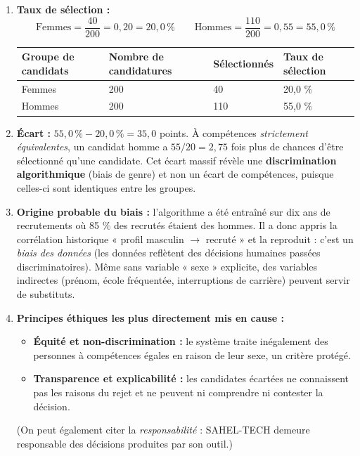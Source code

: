\documentclass[11pt]{article}
\begin{document}
\begin{corrige}
\begin{enumerate}
\item \textbf{Taux de sélection :}
\[ \text{Femmes} = \frac{40}{200} = 0,20 = 20,0\,\% \qquad \text{Hommes} = \frac{110}{200} = 0,55 = 55,0\,\% \]
\begin{center}
\begin{tabularx}{\linewidth}{|l|X|X|X|}
\hline
\rowcolor{popblueL} \textbf{Groupe de candidats} & \textbf{Nombre de candidatures} & \textbf{Sélectionnés} & \textbf{Taux de sélection} \\
\hline
Femmes & 200 & 40 & 20,0 \% \\
\hline
Hommes & 200 & 110 & 55,0 \% \\
\hline
\end{tabularx}
\end{center}
\item \textbf{Écart :} $55,0\,\% - 20,0\,\% = 35,0$ points. À compétences \emph{strictement équivalentes}, un candidat homme a $55/20 = 2,75$ fois plus de chances d'être sélectionné qu'une candidate. Cet écart massif révèle une \textbf{discrimination algorithmique} (biais de genre) et non un écart de compétences, puisque celles-ci sont identiques entre les groupes.
\item \textbf{Origine probable du biais :} l'algorithme a été entraîné sur dix ans de recrutements où 85 \% des recrutés étaient des hommes. Il a donc appris la corrélation historique « profil masculin $\to$ recruté » et la reproduit : c'est un \emph{biais des données} (les données reflètent des décisions humaines passées discriminatoires). Même sans variable « sexe » explicite, des variables indirectes (prénom, école fréquentée, interruptions de carrière) peuvent servir de substituts.
\item \textbf{Principes éthiques les plus directement mis en cause :}
\begin{itemize}
\item \textbf{Équité et non-discrimination :} le système traite inégalement des personnes à compétences égales en raison de leur sexe, un critère protégé.
\item \textbf{Transparence et explicabilité :} les candidates écartées ne connaissent pas les raisons du rejet et ne peuvent ni comprendre ni contester la décision.
\end{itemize}
(On peut également citer la \emph{responsabilité} : SAHEL-TECH demeure responsable des décisions produites par son outil.)

\end{enumerate}
\end{corrige}
\end{document}
